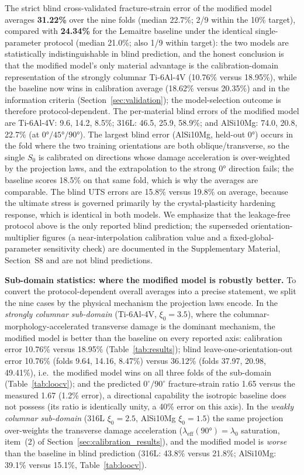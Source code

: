 \documentclass[12pt,a4paper,twocolumn]{article}
\begin{document}
The strict blind cross-validated fracture-strain error of the modified model averages \textbf{31.22\%} over the nine folds (median 22.7\%; 2/9 within the 10\% target), compared with \textbf{24.34\%} for the Lemaitre baseline under the identical single-parameter protocol (median 21.0\%; also 1/9 within target): the two models are statistically indistinguishable in blind prediction, and the honest conclusion is that the modified model's only material advantage is the calibration-domain representation of the strongly columnar Ti-6Al-4V (10.76\% versus 18.95\%), while the baseline now wins in calibration average (18.62\% versus 20.35\%) and in the information criteria (Section~\ref{sec:validation}); the model-selection outcome is therefore protocol-dependent. The per-material blind errors of the modified model are Ti-6Al-4V: 9.6, 14.2, 8.5\%; 316L: 46.5, 25.9, 58.9\%; and AlSi10Mg: 74.0, 20.8, 22.7\% (at $\ang{0}/\ang{45}/\ang{90}$). The largest blind error (AlSi10Mg, held-out $\ang{0}$) occurs in the fold where the two training orientations are both oblique/transverse, so the single $S_0$ is calibrated on directions whose damage acceleration is over-weighted by the projection laws, and the extrapolation to the strong $\ang{0}$ direction fails; the baseline scores 18.5\% on that same fold, which is why the averages are comparable. The blind UTS errors are 15.8\% versus 19.8\% on average, because the ultimate stress is governed primarily by the crystal-plasticity hardening response, which is identical in both models. We emphasize that the leakage-free protocol above is the only reported blind prediction; the superseded orientation-multiplier figures (a near-interpolation calibration value and a fixed-global-parameter sensitivity check) are documented in the Supplementary Material, Section~S8 and are not blind predictions.



\textbf{Sub-domain statistics: where the modified model is robustly better.}
To convert the protocol-dependent overall averages into a precise statement, we split the nine cases by the physical mechanism the projection laws encode. In the \emph{strongly columnar sub-domain} (Ti-6Al-4V, $\xi_0 = 3.5$), where the columnar-morphology-accelerated transverse damage is the dominant mechanism, the modified model is better than the baseline on every reported axis: calibration error 10.76\% versus 18.95\% (Table~\ref{tab:results}); blind leave-one-orientation-out error 10.76\% (folds 9.64, 14.16, 8.47\%) versus 36.12\% (folds 37.97, 20.98, 49.41\%), i.e.\ the modified model wins on all three folds of the sub-domain (Table~\ref{tab:loocv}); and the predicted $0^\circ/90^\circ$ fracture-strain ratio 1.65 versus the measured 1.67 (1.2\% error), a directional capability the isotropic baseline does not possess (its ratio is identically unity, a 40\% error on this axis). In the \emph{weakly columnar sub-domain} (316L $\xi_0 = 2.5$, AlSi10Mg $\xi_0 = 1.5$) the same projection over-weights the transverse damage acceleration ($\lambda_{\mathrm{eff}}(\ang{90}) = \lambda_0$ saturation, item~(2) of Section~\ref{sec:calibration_results}), and the modified model is \emph{worse} than the baseline in blind prediction (316L: 43.8\% versus 21.8\%; AlSi10Mg: 39.1\% versus 15.1\%, Table~\ref{tab:loocv}).
\end{document}
